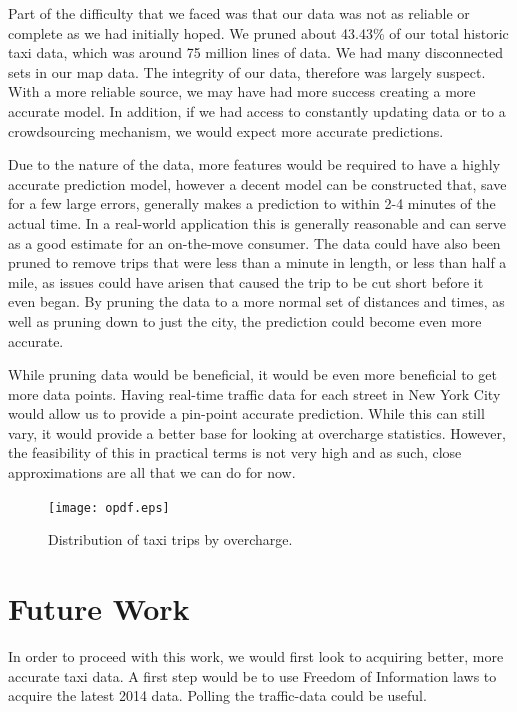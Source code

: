 \documentclass{sig-alternate}
\begin{document}
Part of the difficulty that we faced was that our data was not as reliable or complete as we had initially hoped.  We pruned about 43.43\% of our total historic taxi data, which was around 75 million lines of data.  We had many disconnected sets in our map data.  The integrity of our data, therefore was largely suspect.  With a more reliable source, we may have had more success creating a more accurate model.  In addition, if we had access to constantly updating data or to a crowdsourcing mechanism, we would expect more accurate predictions.

Due to the nature of the data, more features would be required to have a highly accurate prediction model, however a decent model can be constructed that, save for a few large errors, generally makes a prediction to within 2-4 minutes of the actual time. In a real-world application this is generally reasonable and can serve as a good estimate for an on-the-move consumer. The data could have also been pruned to remove trips that were less than a minute in length, or less than half a mile, as issues could have arisen that caused the trip to be cut short before it even began. By pruning the data to a more normal set of distances and times, as well as pruning down to just the city, the prediction could become even more accurate.

While pruning data would be beneficial, it would be even more beneficial to get more data points. Having real-time traffic data for each street in New York City would allow us to provide a pin-point accurate prediction. While this can still vary, it would provide a better base for looking at overcharge statistics. However, the feasibility of this in practical terms is not very high and as such, close approximations are all that we can do for now.



\begin{figure}
\texttt{[image: opdf.eps]}
\caption{Distribution of taxi trips by overcharge.}
\end{figure}

\section{Future Work}

In order to proceed with this work, we would first look to acquiring better, more accurate taxi data. A first step would be to use Freedom of Information laws to acquire the latest 2014 data. Polling the traffic-data could be useful. 
\end{document}
